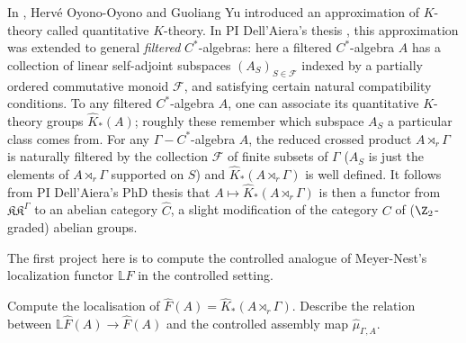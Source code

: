 
In \cite{OY2}, Herv\'{e} Oyono-Oyono and Guoliang Yu introduced an approximation of $K$-theory called quantitative $K$-theory. In PI Dell'Aiera's thesis \cite{DellAieraThesis}, this approximation was extended to general \emph{filtered} $C^*$-algebras: here a filtered $C^*$-algebra $A$ has a collection of linear self-adjoint subspaces $(A_S)_{S\in \mathcal{F}}$ indexed by a partially ordered commutative monoid $\mathcal{F}$, and satisfying certain natural compatibility conditions.  To any filtered $C^*$-algebra $A$, one can associate its quantitative $K$-theory groups $\hat K_*(A)$; roughly these remember which subspace $A_S$ a particular class comes from.  For any $\Gamma-C^*$-algebra $A$, the reduced crossed product $A\rtimes_r \Gamma$ is naturally filtered by the collection $\mathcal F$ of finite subsets of $\Gamma$ ($A_S$ is just the elements of $A\rtimes_r\Gamma$ supported on $S$) and $\hat K_* (A\rtimes_r \Gamma)$ is well defined. It follows from PI Dell'Aiera's PhD thesis that $A\mapsto \hat K_*(A\rtimes_r \Gamma)$ is then a functor from $\mathfrak{KK}^\Gamma$ to an abelian category $\hat C$, a slight modification of the category $C$ of ($\Z_2$-graded) abelian groups.


The first project here is to compute the controlled analogue of Meyer-Nest's localization functor $\mathbb{L}F$ in the controlled setting.

\begin{project} Compute the localisation of $\hat F( A) = \hat K_*(A\rtimes_r \Gamma) $. Describe the relation between $\mathbb L \hat F(A)\rightarrow \hat F(A)$ and the controlled assembly map
$\hat \mu_{\Gamma,A}$.	
\end{project}

